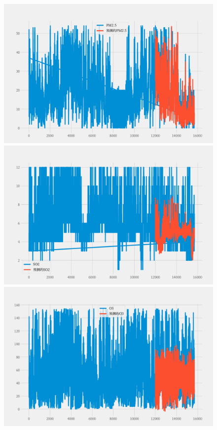 \documentclass[a4paper,10pt]{my_paper}
\numberwithin{equation}{section}
\begin{document}
\begin{figure}[htbp]
\begin{minipage}[c]{0.3\textwidth}
		\end{minipage}
		\begin{minipage}[c]{0.3\textwidth}
			\centering
			\includegraphics[width=1\textwidth]{prob4/预测A3地_PM2..pdf} 
		\end{minipage}
    \begin{minipage}[c]{0.3\textwidth}
			\centering
			\includegraphics[width=1\textwidth]{prob4/预测A3地_SO2.pdf} 
		\end{minipage}
    \begin{minipage}[c]{0.3\textwidth}
			\centering
			\includegraphics[width=1\textwidth]{prob4/预测A3地_O3.pdf} 

\end{minipage}
\end{figure}
\end{document}
